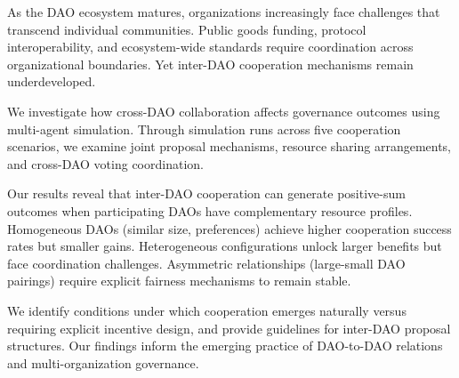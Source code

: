 
As the DAO ecosystem matures, organizations increasingly face challenges that transcend individual communities. Public goods funding, protocol interoperability, and ecosystem-wide standards require coordination across organizational boundaries. Yet inter-DAO cooperation mechanisms remain underdeveloped.

We investigate how cross-DAO collaboration affects governance outcomes using multi-agent simulation. Through \experimentruns{} simulation runs across five cooperation scenarios, we examine joint proposal mechanisms, resource sharing arrangements, and cross-DAO voting coordination.

Our results reveal that inter-DAO cooperation can generate positive-sum outcomes when participating DAOs have complementary resource profiles. Homogeneous DAOs (similar size, preferences) achieve higher cooperation success rates but smaller gains. Heterogeneous configurations unlock larger benefits but face coordination challenges. Asymmetric relationships (large-small DAO pairings) require explicit fairness mechanisms to remain stable.

We identify conditions under which cooperation emerges naturally versus requiring explicit incentive design, and provide guidelines for inter-DAO proposal structures. Our findings inform the emerging practice of DAO-to-DAO relations and multi-organization governance.
